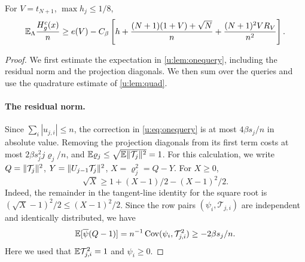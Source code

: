 \begin{lemma}\label{u:lem:fine-energy}
For $V=t_{N+1}$, $\max h_j\le1/8$,
\begin{equation}\label{u:eq:fine-energy}
 \mathbb E_\Lambda\frac{H^c_g(x)}n\ge e(V)-C_\beta\left[
 h+\frac{(N+1)(1+V)+\sqrt N}{n}
                         +\frac{(N+1)^2VR_V}{n^2}\right].
\end{equation}
\end{lemma}
\begin{proof}
We first estimate the expectation in \cref{u:lem:onequery}, including
the residual norm and the projection diagonals. We then sum over the
queries and use the quadrature estimate of \cref{u:lem:quad}.

\paragraph{The residual norm.}
Since $\sum_i|u_{j,i}|\le n$, the correction in \eqref{u:eq:onequery} is at
most $4\beta s_j/n$ in absolute value. Removing the projection diagonals
from its first term costs at most $2\beta s_j^2j \varrho_j/n$, and
$\mathbb E \varrho_j\le\sqrt{\mathbb E\lVert \mathcal T_j\rVert^2}=1$.
For this calculation, we write
$Q=\lVert \mathcal T_j\rVert^2$, $Y=\lVert U_{j-1}\mathcal T_j\rVert^2$, $X=\varrho_j^2=Q-Y$.
For $X\ge0$,
\begin{equation}\label{u:eq:residual-square-root}
 \sqrt X\ge1+(X-1)/2-(X-1)^2/2.
\end{equation}
Indeed, the remainder in the tangent-line identity for the square root
is $(\sqrt X-1)^2/2\le(X-1)^2/2$.
Since the row pairs $(\psi_i,\mathcal T_{j,i})$ are independent and identically distributed, we have
\begin{equation}\label{u:eq:residual-covariance}
 \mathbb E[\overline\psi(Q-1)]
       =n^{-1}\operatorname{Cov}(\psi_i,\mathcal T_{j,i}^2)
       \ge-2\beta s_j/n.
\end{equation}
Here we used that $\mathbb E \mathcal T_{j,i}^2=1$ and $\psi_i\ge0$.


\end{proof}
